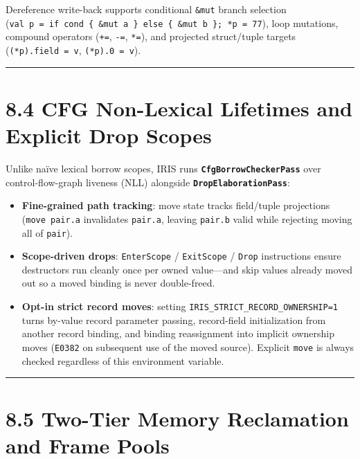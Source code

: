 \documentclass[
  english,
  oneside]{book}
\providecommand{\tightlist}{%
  \setlength{\itemsep}{0pt}\setlength{\parskip}{0pt}}
\begin{document}
Dereference write-back supports conditional \texttt{\&mut} branch
selection
(\texttt{val\ p\ =\ if\ cond\ \{\ \&mut\ a\ \}\ else\ \{\ \&mut\ b\ \};\ *p\ =\ 77}),
loop mutations, compound operators (\texttt{+=}, \texttt{-=},
\texttt{*=}), and projected struct/tuple targets
(\texttt{(*p).field\ =\ v}, \texttt{(*p).0\ =\ v}).

\begin{center}\rule{0.5\linewidth}{0.5pt}\end{center}

\section{8.4 CFG Non-Lexical Lifetimes and Explicit Drop
Scopes}\label{cfg-non-lexical-lifetimes-and-explicit-drop-scopes}

Unlike naïve lexical borrow scopes, IRIS runs
\textbf{\texttt{CfgBorrowCheckerPass}} over control-flow-graph liveness
(NLL) alongside \textbf{\texttt{DropElaborationPass}}:

\begin{itemize}
\tightlist
\item
  \textbf{Fine-grained path tracking}: move state tracks field/tuple
  projections (\texttt{move\ pair.a} invalidates \texttt{pair.a},
  leaving \texttt{pair.b} valid while rejecting moving all of
  \texttt{pair}).
\item
  \textbf{Scope-driven drops}: \texttt{EnterScope} / \texttt{ExitScope}
  / \texttt{Drop} instructions ensure destructors run cleanly once per
  owned value---and skip values already moved out so a moved binding is
  never double-freed.
\item
  \textbf{Opt-in strict record moves}: setting
  \texttt{IRIS\_STRICT\_RECORD\_OWNERSHIP=1} turns by-value record
  parameter passing, record-field initialization from another record
  binding, and binding reassignment into implicit ownership moves
  (\texttt{E0382} on subsequent use of the moved source). Explicit
  \texttt{move} is always checked regardless of this environment
  variable.
\end{itemize}

\begin{center}\rule{0.5\linewidth}{0.5pt}\end{center}

\section{8.5 Two-Tier Memory Reclamation and Frame
Pools}\label{two-tier-memory-reclamation-and-frame-pools}
\end{document}
